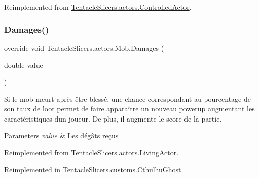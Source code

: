 Reimplemented from \hyperlink{class_tentacle_slicers_1_1actors_1_1_controlled_actor_afcfec115f484efa6142c2f82e1a1f4d5}{Tentacle\+Slicers.\+actors.\+Controlled\+Actor}.

\mbox{\label{class_tentacle_slicers_1_1actors_1_1_mob_ac596097268c10f823e40533c869ced33}} 
\subsubsection{\texorpdfstring{Damages()}{Damages()}}
{\footnotesize\ttfamily override void Tentacle\+Slicers.\+actors.\+Mob.\+Damages (\begin{DoxyParamCaption}\item[{double}]{value }\end{DoxyParamCaption})\hspace{0.3cm}{\ttfamily [virtual]}}



Si le mob meurt après être blessé, une chance correspondant au pourcentage de son taux de loot permet de faire apparaître un nouveau powerup augmentant les caractéristiques d\textquotesingle{}un joueur. De plus, il augmente le score de la partie. 


\begin{DoxyParams}{Parameters}
{\em value} & Les dégâts reçus \\
\hline
\end{DoxyParams}


Reimplemented from \hyperlink{class_tentacle_slicers_1_1actors_1_1_living_actor_a14c215128afe9c82bb57237501f41640}{Tentacle\+Slicers.\+actors.\+Living\+Actor}.



Reimplemented in \hyperlink{class_tentacle_slicers_1_1customs_1_1_cthulhu_ghost_aeeb398970bf8433917fe035f5ec47f66}{Tentacle\+Slicers.\+customs.\+Cthulhu\+Ghost}.

\mbox{\label{class_tentacle_slicers_1_1actors_1_1_mob_a9a27f7eb262346d1e1837df5316823f2}} 
